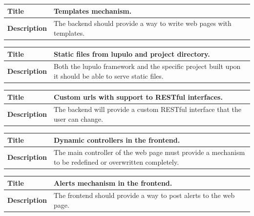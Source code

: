 \documentclass[12pt]{article}
\begin{document}
                \begin{tabularx}{\textwidth}{|l|X|}
                    \hline
                    \textbf{Title} & Templates mechanism. \\
                    \hline
                    \textbf{Description} & The backend should provide a way to
                    write web pages with templates. \\
                    \hline
                \end{tabularx}

                \begin{tabularx}{\textwidth}{|l|X|}
                    \hline
                    \textbf{Title} & Static files from lupulo and project
                    directory. \\
                    \hline
                    \textbf{Description} & Both the lupulo framework and the
                    specific project built upon it should be able to serve
                    static files. \\
                    \hline
                \end{tabularx}

                \begin{tabularx}{\textwidth}{|l|X|}
                    \hline
                    \textbf{Title} & Custom urls with support to RESTful
                    interfaces. \\
                    \hline
                    \textbf{Description} & The backend will provide a custom
                    RESTful interface that the user can change. \\
                    \hline
                \end{tabularx}

                \begin{tabularx}{\textwidth}{|l|X|}
                    \hline
                    \textbf{Title} & Dynamic controllers in the frontend. \\
                    \hline
                    \textbf{Description} & The main controller of the web page
                    must provide a mechanism to be redefined or overwritten
                    completely. \\
                    \hline
                \end{tabularx}

                \begin{tabularx}{\textwidth}{|l|X|}
                    \hline
                    \textbf{Title} & Alerts mechanism in the frontend. \\
                    \hline
                    \textbf{Description} & The frontend should provide a way to
                    post alerts to the web page. \\
                    \hline
                \end{tabularx}
\end{document}
